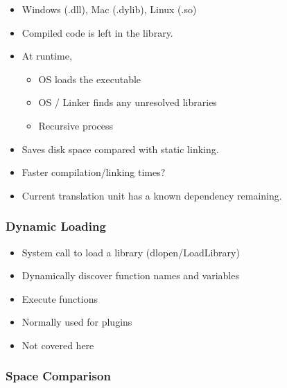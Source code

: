 \begin{itemize}
\itemsep1pt\parskip0pt
\item
  Windows (.dll), Mac (.dylib), Linux (.so)
\item
  Compiled code is left in the library.
\item
  At runtime,

  \begin{itemize}
  \itemsep1pt\parskip0pt
  \item
    OS loads the executable
  \item
    OS / Linker finds any unresolved libraries
  \item
    Recursive process
  \end{itemize}
\item
  Saves disk space compared with static linking.
\item
  Faster compilation/linking times?
\item
  Current translation unit has a known dependency remaining.
\end{itemize}

\subsubsection{Dynamic Loading}\label{dynamic-loading}

\begin{itemize}
\itemsep1pt\parskip0pt
\item
  System call to load a library (dlopen/LoadLibrary)
\item
  Dynamically discover function names and variables
\item
  Execute functions
\item
  Normally used for plugins
\item
  Not covered here
\end{itemize}

\subsubsection{Space Comparison}\label{space-comparison}

